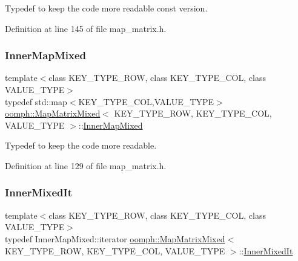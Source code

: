 Typedef to keep the code more readable const version. 



Definition at line 145 of file map\+\_\+matrix.\+h.

\mbox{\label{classoomph_1_1MapMatrixMixed_aed39c3f0e6377a36ea7653c6de21b0ce}} 
\subsubsection{\texorpdfstring{Inner\+Map\+Mixed}{InnerMapMixed}}
{\footnotesize\ttfamily template$<$class K\+E\+Y\+\_\+\+T\+Y\+P\+E\+\_\+\+R\+OW, class K\+E\+Y\+\_\+\+T\+Y\+P\+E\+\_\+\+C\+OL, class V\+A\+L\+U\+E\+\_\+\+T\+Y\+PE$>$ \\
typedef std\+::map$<$K\+E\+Y\+\_\+\+T\+Y\+P\+E\+\_\+\+C\+OL,V\+A\+L\+U\+E\+\_\+\+T\+Y\+PE$>$ \hyperlink{classoomph_1_1MapMatrixMixed}{oomph\+::\+Map\+Matrix\+Mixed}$<$ K\+E\+Y\+\_\+\+T\+Y\+P\+E\+\_\+\+R\+OW, K\+E\+Y\+\_\+\+T\+Y\+P\+E\+\_\+\+C\+OL, V\+A\+L\+U\+E\+\_\+\+T\+Y\+PE $>$\+::\hyperlink{classoomph_1_1MapMatrixMixed_aed39c3f0e6377a36ea7653c6de21b0ce}{Inner\+Map\+Mixed}}



Typedef to keep the code more readable. 



Definition at line 129 of file map\+\_\+matrix.\+h.

\mbox{\label{classoomph_1_1MapMatrixMixed_a88516855a59e81851521a52d5355e9c9}} 
\subsubsection{\texorpdfstring{Inner\+Mixed\+It}{InnerMixedIt}}
{\footnotesize\ttfamily template$<$class K\+E\+Y\+\_\+\+T\+Y\+P\+E\+\_\+\+R\+OW, class K\+E\+Y\+\_\+\+T\+Y\+P\+E\+\_\+\+C\+OL, class V\+A\+L\+U\+E\+\_\+\+T\+Y\+PE$>$ \\
typedef Inner\+Map\+Mixed\+::iterator \hyperlink{classoomph_1_1MapMatrixMixed}{oomph\+::\+Map\+Matrix\+Mixed}$<$ K\+E\+Y\+\_\+\+T\+Y\+P\+E\+\_\+\+R\+OW, K\+E\+Y\+\_\+\+T\+Y\+P\+E\+\_\+\+C\+OL, V\+A\+L\+U\+E\+\_\+\+T\+Y\+PE $>$\+::\hyperlink{classoomph_1_1MapMatrixMixed_a88516855a59e81851521a52d5355e9c9}{Inner\+Mixed\+It}}



